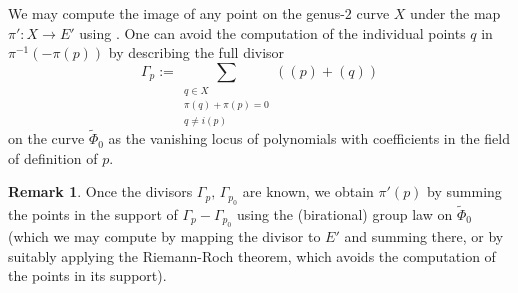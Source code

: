 \documentclass[a4paper,twoside,english]{amsart}
\theoremstyle{plain}
\theoremstyle{definition}
\newtheorem{remark}[theorem]{Remark}
\begin{document}
We may compute the image of any point on the genus-$2$ curve $X$ under the map $\pi' : X \to E'$ using . One can avoid the computation of the individual points $q$ in $\pi^{-1}(-\pi(p))$ by describing the full divisor
\begin{equation}\label{eq: divisor on Phi0tilde}
   \Gamma_p := \sum_{\substack{q \in X \\ \pi(q)+\pi(p)=0 \\ q \neq i(p)}} ((p)+(q))
\end{equation}
on the curve $\tilde{\Phi}_0$ as the vanishing locus of polynomials with coefficients in the field of definition of $p$. %
\begin{remark}
    Once the divisors $\Gamma_p,\, \Gamma_{p_0}$ are known, we obtain $\pi'(p)$ by summing the points in the support of $\Gamma_p - \Gamma_{p_0}$ using the (birational) group law on $\tilde{\Phi}_0$ (which we may compute by mapping the divisor to $E'$ and summing there, or by suitably applying the Riemann-Roch theorem, which avoids the computation of the points in its support).
\end{remark}
\end{document}

